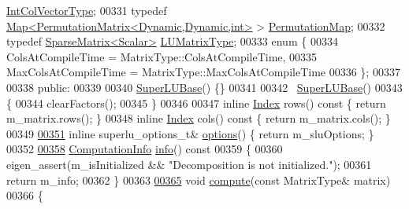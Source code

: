 \begin{DoxyCode}
      \hyperlink{group___core___module}{IntColVectorType};    
00331     \textcolor{keyword}{typedef} \hyperlink{group___core___module_class_eigen_1_1_map}{Map<PermutationMatrix<Dynamic,Dynamic,int>} > 
      \hyperlink{group___core___module_class_eigen_1_1_map}{PermutationMap};
00332     \textcolor{keyword}{typedef} \hyperlink{group___sparse_core___module}{SparseMatrix<Scalar>} \hyperlink{group___sparse_core___module}{LUMatrixType};
00333     \textcolor{keyword}{enum} \{
00334       ColsAtCompileTime = MatrixType::ColsAtCompileTime,
00335       MaxColsAtCompileTime = MatrixType::MaxColsAtCompileTime
00336     \};
00337 
00338   \textcolor{keyword}{public}:
00339 
00340     \hyperlink{class_eigen_1_1_super_l_u_base}{SuperLUBase}() \{\}
00341 
00342     ~\hyperlink{class_eigen_1_1_super_l_u_base}{SuperLUBase}()
00343     \{
00344       clearFactors();
00345     \}
00346     
00347     \textcolor{keyword}{inline} \hyperlink{namespace_eigen_a62e77e0933482dafde8fe197d9a2cfde}{Index} rows()\textcolor{keyword}{ const }\{ \textcolor{keywordflow}{return} m\_matrix.rows(); \}
00348     \textcolor{keyword}{inline} \hyperlink{namespace_eigen_a62e77e0933482dafde8fe197d9a2cfde}{Index} cols()\textcolor{keyword}{ const }\{ \textcolor{keywordflow}{return} m\_matrix.cols(); \}
00349     
\hyperlink{class_eigen_1_1_super_l_u_base_a42d9d79073379f1e75b0f2c49879ed5b}{00351}     \textcolor{keyword}{inline} superlu\_options\_t& \hyperlink{class_eigen_1_1_super_l_u_base_a42d9d79073379f1e75b0f2c49879ed5b}{options}() \{ \textcolor{keywordflow}{return} m\_sluOptions; \}
00352     
\hyperlink{class_eigen_1_1_super_l_u_base_aa67da5c8c24110931c949c5896c5ec03}{00358}     \hyperlink{group__enums_ga85fad7b87587764e5cf6b513a9e0ee5e}{ComputationInfo} \hyperlink{class_eigen_1_1_super_l_u_base_aa67da5c8c24110931c949c5896c5ec03}{info}()\textcolor{keyword}{ const}
00359 \textcolor{keyword}{    }\{
00360       eigen\_assert(m\_isInitialized && \textcolor{stringliteral}{"Decomposition is not initialized."});
00361       \textcolor{keywordflow}{return} m\_info;
00362     \}
00363 
\hyperlink{class_eigen_1_1_super_l_u_base_a28cb3ef7914ecb6fdae1935b53f6be40}{00365}     \textcolor{keywordtype}{void} \hyperlink{class_eigen_1_1_super_l_u_base_a28cb3ef7914ecb6fdae1935b53f6be40}{compute}(\textcolor{keyword}{const} MatrixType& matrix)
00366     \{

\end{DoxyCode}
